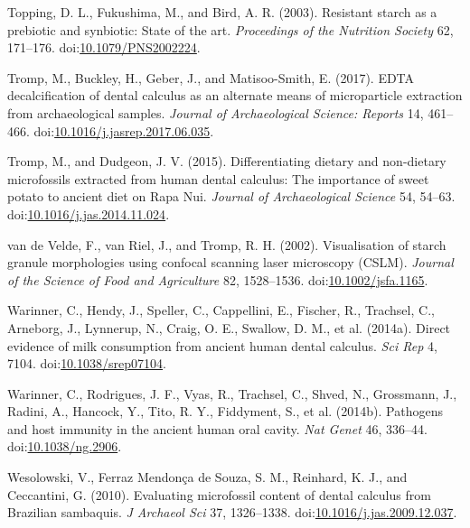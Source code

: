 \documentclass[utf8]{../templates/frontiersSCNS}
\newlength{\cslhangindent}
\newlength{\cslentryspacingunit} %
\newenvironment{CSLReferences}[2] %
 {%
  \setlength{\parindent}{0pt}
  \ifodd #1
  \let\oldpar\par
  \def\par{\hangindent=\cslhangindent\oldpar}
  \fi
  \setlength{\parskip}{#2\cslentryspacingunit}
 }%
 {}
\begin{document}
\begin{CSLReferences}{1}{0}
\leavevmode{}%
Topping, D. L., Fukushima, M., and Bird, A. R. (2003). Resistant starch as a prebiotic and synbiotic: State of the art. \emph{Proceedings of the Nutrition Society} 62, 171--176. doi:\href{https://doi.org/10.1079/PNS2002224}{10.1079/PNS2002224}.

\leavevmode{}%
Tromp, M., Buckley, H., Geber, J., and Matisoo-Smith, E. (2017). {EDTA} decalcification of dental calculus as an alternate means of microparticle extraction from archaeological samples. \emph{Journal of Archaeological Science: Reports} 14, 461--466. doi:\href{https://doi.org/10.1016/j.jasrep.2017.06.035}{10.1016/j.jasrep.2017.06.035}.

\leavevmode{}%
Tromp, M., and Dudgeon, J. V. (2015). Differentiating dietary and non-dietary microfossils extracted from human dental calculus: The importance of sweet potato to ancient diet on {Rapa Nui}. \emph{Journal of Archaeological Science} 54, 54--63. doi:\href{https://doi.org/10.1016/j.jas.2014.11.024}{10.1016/j.jas.2014.11.024}.

\leavevmode{}%
van de Velde, F., van Riel, J., and Tromp, R. H. (2002). Visualisation of starch granule morphologies using confocal scanning laser microscopy ({CSLM}). \emph{Journal of the Science of Food and Agriculture} 82, 1528--1536. doi:\href{https://doi.org/10.1002/jsfa.1165}{10.1002/jsfa.1165}.

\leavevmode{}%
Warinner, C., Hendy, J., Speller, C., Cappellini, E., Fischer, R., Trachsel, C., Arneborg, J., Lynnerup, N., Craig, O. E., Swallow, D. M., et al. (2014a). Direct evidence of milk consumption from ancient human dental calculus. \emph{Sci Rep} 4, 7104. doi:\href{https://doi.org/10.1038/srep07104}{10.1038/srep07104}.

\leavevmode{}%
Warinner, C., Rodrigues, J. F., Vyas, R., Trachsel, C., Shved, N., Grossmann, J., Radini, A., Hancock, Y., Tito, R. Y., Fiddyment, S., et al. (2014b). Pathogens and host immunity in the ancient human oral cavity. \emph{Nat Genet} 46, 336--44. doi:\href{https://doi.org/10.1038/ng.2906}{10.1038/ng.2906}.

\leavevmode{}%
Wesolowski, V., Ferraz Mendonça de Souza, S. M., Reinhard, K. J., and Ceccantini, G. (2010). Evaluating microfossil content of dental calculus from {Brazilian} sambaquis. \emph{J Archaeol Sci} 37, 1326--1338. doi:\href{https://doi.org/10.1016/j.jas.2009.12.037}{10.1016/j.jas.2009.12.037}.


\end{CSLReferences}
\end{document}
